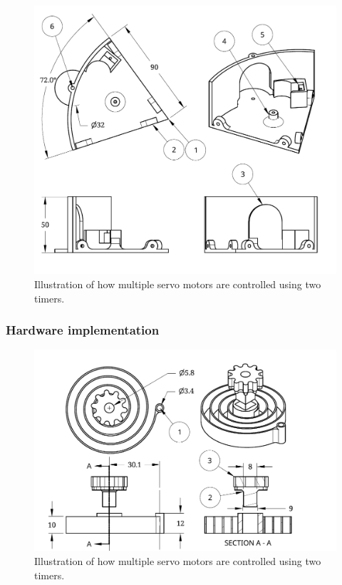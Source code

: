 \begin{figure}[H]
\centering
\includegraphics[scale = 0.8]{pics/DrawingBase.pdf}
\caption{Illustration of how multiple servo motors are controlled using two timers.}
\label{fig:DrawingBase}
\end{figure}

\subsubsection{Hardware implementation}

\begin{figure}[H]
\centering
\includegraphics[scale = 0.8]{pics/DrawingSpring.pdf}
\caption{Illustration of how multiple servo motors are controlled using two timers.}
\label{fig:DrawingSpring}
\end{figure}
